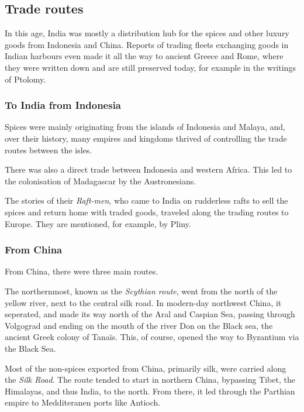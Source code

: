 \documentclass[11pt, a4paper, headings=standardclasses]{scrartcl}
\begin{document}
\subsection{Trade routes}
In this age, India was mostly a distribution hub for the spices and other luxury goods from Indonesia and China. Reports of trading fleets exchanging goods in Indian harbours even made it all the way to ancient Greece and Rome, where they were written down and are still preserved today, for example in the writings of Ptolomy.\autocite[p.~148-150]{Rome}

\subsubsection{To India from Indonesia}

Spices were mainly originating from the islands of Indonesia and Malaya, and, over their history, many empires and kingdoms thrived of controlling the trade routes between the isles.\autocite{Indonesia}

There was also a direct trade between Indonesia and western Africa. This led to the colonisation of Madagascar by the Austronesians.\autocite{Madagascar}

The stories of their \emph{Raft-men}, who came to India on rudderless rafts to sell the spices and return home with traded goods, traveled along the trading routes to Europe. They are mentioned, for example, by Pliny.\autocite[Chapter 8]{Rome}

\subsubsection{From China}

From China, there were three main routes.

The northernmost, known as the \emph{Scythian route}, went from the north of the yellow river, next to the central silk road. In modern-day northwest China, it seperated, and made its way north of the Aral and Caspian Sea, passing through Volgograd and ending on the mouth of the river Don on the Black sea, the ancient Greek colony of Tana\"{i}s. This, of course, opened the way to Byzantium via the Black Sea.\autocite[149]{Rome}

Most of the non-spices exported from China, primarily silk, were carried along the \emph{Silk Road}. The route tended to start in northern China, bypassing Tibet, the Himalayas, and thus India, to the north. From there, it led through the Parthian empire\autocite{SilkRome} to Medditeranen ports like Antioch.\autocite[Chapter 7, Maps 2 and 3]{Rome}
\end{document}
